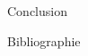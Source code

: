 \documentclass[11pt]{beamer}
\begin{document}
\begin{section}{Conclusion}
 
\end{section}

\begin{frame}{Bibliographie}

\end{frame}
\end{document}
